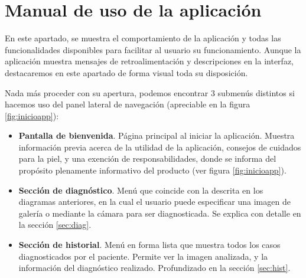  \section{Manual de uso de la aplicación}
 En este apartado, se muestra el comportamiento de la aplicación y todas las funcionalidades disponibles para facilitar al usuario su funcionamiento.  Aunque la aplicación muestra mensajes de retroalimentación y descripciones en la interfaz, destacaremos en este apartado de forma visual toda su disposición.
 
 Nada más proceder con su apertura, podemos encontrar 3 submenús distintos si hacemos uso del panel lateral de navegación (apreciable en la figura  \ref{fig:inicioapp}):
 \begin{itemize}
 	\item  \textbf{Pantalla de bienvenida}. Página principal al iniciar la aplicación. Muestra información previa acerca de la utilidad de la aplicación, consejos de cuidados para la piel, y una exención de responsabilidades, donde se informa del propósito plenamente informativo del producto (ver figura \ref{fig:inicioapp}).
 	\item \textbf{Sección de diagnóstico}. Menú que coincide con la descrita en los diagramas anteriores, en la cual el usuario puede especificar una imagen de galería o mediante la cámara para ser diagnosticada. Se explica con detalle en la sección \ref{sec:diag}.
 	\item \textbf{Sección de historial}. Menú en forma lista que muestra todos los casos diagnosticados por el paciente. Permite ver la imagen analizada, y la información del diagnóstico realizado. Profundizado en la sección \ref{sec:hist}.
 \end{itemize}
 

